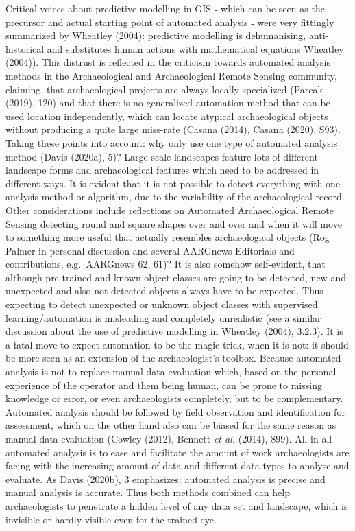 \documentclass[
  12pt,
]{article}
\begin{document}
Critical voices about predictive modelling in GIS ˗ which can be seen as the precursor and actual starting point of automated analysis ˗ were very fittingly summarized by Wheatley (2004): predictive modelling is dehumanising, anti-historical and substitutes human actions with mathematical equations Wheatley (2004)). This distrust is reflected in the criticism towards automated analysis methods in the Archaeological and Archaeological Remote Sensing community, claiming, that archaeological projects are always locally specialized (Parcak (2019), 120) and that there is no generalized automation method that can be used location independently, which can locate atypical archaeological objects without producing a quite large miss-rate (Casana (2014), Casana (2020), S93). Taking these points into account: why only use one type of automated analysis method (Davis (2020a), 5)? Large-scale landscapes feature lots of different landscape forms and archaeological features which need to be addressed in different ways. It is evident that it is not possible to detect everything with one analysis method or algorithm, due to the variability of the archaeological record. Other considerations include reflections on Automated Archaeological Remote Sensing detecting round and square shapes over and over and when it will move to something more useful that actually resembles archaeological objects (Rog Palmer in personal discussion and several AARGnews Editorials and contributions, e.g.~AARGnews 62, 61)?
It is also somehow self-evident, that although pre-trained and known object classes are going to be detected, new and unexpected and also not detected objects always have to be expected. Thus expecting to detect unexpected or unknown object classes with supervised learning/automation is misleading and completely unrealistic (see a similar discussion about the use of predictive modelling in Wheatley (2004), 3.2.3). It is a fatal move to expect automation to be the magic trick, when it is not: it should be more seen as an extension of the archaeologist's toolbox. Because automated analysis is not to replace manual data evaluation which, based on the personal experience of the operator and them being human, can be prone to missing knowledge or error, or even archaeologists completely, but to be complementary. Automated analysis should be followed by field observation and identification for assessment, which on the other hand also can be biased for the same reason as manual data evaluation (Cowley (2012), Bennett \emph{et al.} (2014), 899). All in all automated analysis is to ease and facilitate the amount of work archaeologists are facing with the increasing amount of data and different data types to analyse and evaluate. As Davis (2020b), 3 emphasizes: automated analysis is precise and manual analysis is accurate. Thus both methods combined can help archaeologists to penetrate a hidden level of any data set and landscape, which is invisible or hardly visible even for the trained eye.
\end{document}
